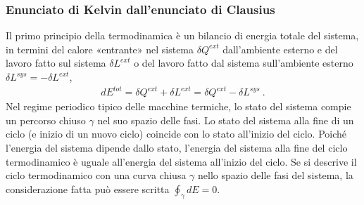 \documentclass[letterpaper,10pt,italian]{jupyterBook}
\begin{document}
\subsubsection*{Enunciato di Kelvin dall’enunciato di Clausius}

\sphinxAtStartPar
Il primo principio della termodinamica è un bilancio di energia totale del sistema, in termini del calore «entrante» nel sistema \(\delta Q^{ext}\) dall’ambiente esterno e del lavoro fatto sul sistema \(\delta L^{ext}\) o del lavoro fatto dal sistema sull’ambiente esterno \(\delta L^{sys} = - \delta L^{ext}\),
\begin{equation*}
\begin{split}d E^{tot} = \delta Q^{ext} + \delta L^{ext} = \delta Q^{ext} - \delta L^{sys} \ .\end{split}
\end{equation*}
\sphinxAtStartPar
Nel regime periodico tipico delle macchine termiche, lo stato del sistema compie un percorso chiuso \(\gamma\) nel suo spazio delle fasi. Lo stato del sistema alla fine di un ciclo (e inizio di un nuovo ciclo) coincide con lo stato all’inizio del ciclo. Poiché l’energia del sistema dipende dallo stato, l’energia del sistema alla fine del ciclo termodinamico è uguale all’energia del sistema all’inizio del ciclo. Se si descrive il ciclo termodinamico con una curva chiusa \(\gamma\) nello spazio delle fasi del sistema, la considerazione fatta può essere scritta \(\oint_{\gamma} dE = 0\).
\end{document}
